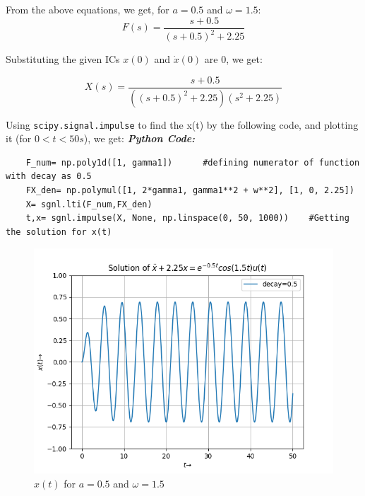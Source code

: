 \documentclass[11pt, a4paper]{article}
\begin{document}
        From the above equations, we get, for $a = 0.5$ and $\omega = 1.5$:
        \begin{equation*}
            F(s) = \frac{s+0.5}{(s+0.5)^2+2.25}
        \end{equation*}

        Substituting the given ICs $x(0)$ and $\dot{x}(0)$ are 0, we get:

        \begin{equation*}
            X(s) = \frac{s+0.5}{((s+0.5)^2+2.25)(s^2+2.25)}
        \end{equation*}

        Using \texttt{scipy.signal.impulse} to find the x(t) by the following code, and plotting it (for $0<t<50 s$), we get:\newline
         \textit{\textbf{Python Code:}}
    \lstset{language=Python}
    \lstset{basicstyle=\footnotesize}
    \begin{lstlisting}
    F_num= np.poly1d([1, gamma1])      #defining numerator of function  with decay as 0.5 
    FX_den= np.polymul([1, 2*gamma1, gamma1**2 + w**2], [1, 0, 2.25])   
    X= sgnl.lti(F_num,FX_den)           
    t,x= sgnl.impulse(X, None, np.linspace(0, 50, 1000))    #Getting the solution for x(t)
    \end{lstlisting}
        \begin{figure}[H]
            \centering
            \includegraphics[scale=0.7]{Figure_1.png}
            \caption{$x(t)$ for $a=0.5$ and $\omega=1.5$}
            \label{fig:Fig1}
        \end{figure}
\end{document}
